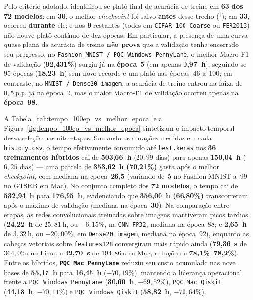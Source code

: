 \documentclass[
    12pt,
    openright,
    oneside,
    a4paper,
    english,
    brazil
]{abntex2}
\begin{document}
Pelo critério adotado, identificou-se platô final de acurácia de treino em \textbf{63 dos 72 modelos}: em \textbf{30}, o melhor \textit{checkpoint} foi salvo \textbf{antes} desse trecho (\(^\dagger\)); em \textbf{33}, ocorreu \textbf{durante} ele; e nos \textbf{9} restantes (todos em \texttt{CIFAR-100 Coarse} ou \texttt{FER2013}) não houve platô contínuo de dez épocas. Em particular, a presença de uma curva quase plana de acurácia de treino \textbf{não prova} que a validação tenha encerrado seu progresso: no \texttt{Fashion-MNIST / PQC Windows PennyLane}, o melhor Macro-F1 de validação (\textbf{92,431\%}) surgiu já na \textbf{época~5} (em apenas \textbf{0,97~h}), seguindo-se 95 épocas (\textbf{18,23~h}) sem novo recorde e um platô nas épocas~46 a~100; em contraste, no \texttt{MNIST / Dense20 imagem}, a acurácia de treino entrou na faixa de \(0{,}5~\text{p.p.}\) já na época~2, mas o maior Macro-F1 de validação ocorreu apenas na \textbf{época~98}.

A Tabela~\ref{tab:tempo_100ep_vs_melhor_epoca} e a Figura~\ref{fig:tempo_100ep_vs_melhor_epoca} sintetizam o impacto temporal dessa seleção nas oito etapas. Somando as durações medidas em cada \texttt{history.csv}, o tempo efetivamente consumido até \texttt{best.keras} nos \textbf{36 treinamentos híbridos} cai de \textbf{503,66~h} (\(20{,}99\) dias) para apenas \textbf{150,04~h} (\(6{,}25\) dias) --- uma parcela de \textbf{353,62~h (70,21\%)} gasta após o melhor \textit{checkpoint}, com mediana na época~\textbf{26,5} (variando de~5 no Fashion-MNIST a~99 no GTSRB em Mac). No conjunto completo dos \textbf{72 modelos}, o tempo cai de \textbf{532,94~h} para \textbf{176,95~h}, evidenciando que \textbf{356,00~h (66,80\%)} transcorreram após o máximo de validação (mediana na época~\textbf{30}). Na comparação entre etapas, as redes convolucionais treinadas sobre imagens mantiveram picos tardios (\textbf{24,22~h} de \(25{,}81~\text{h}\), ou \(-6{,}15\%\), na \texttt{CNN FP32}, mediana na época~88; e \textbf{2,65~h} de \(3{,}32~\text{h}\), ou \(-20{,}00\%\), em \texttt{Dense20 imagem}, mediana na época~92), enquanto as cabeças vetoriais sobre \texttt{features128} convergiram mais rápido ainda (\textbf{79,36~s} de \(364{,}02~\text{s}\) no Linux e \textbf{42,70~s} de \(194{,}86~\text{s}\) no Mac, redução de \textbf{78,1\%--78,2\%}). Entre os híbridos, \textbf{\texttt{PQC Mac PennyLane}} reduziu seu custo acumulado nas nove bases de \textbf{55,17~h} para \textbf{16,45~h} (\(-70{,}19\%\)), mantendo a liderança operacional frente a \texttt{PQC Windows PennyLane} (\textbf{30,60~h}, \(-69{,}52\%\)), \texttt{PQC Mac Qiskit} (\textbf{44,18~h}, \(-70{,}11\%\)) e \texttt{PQC Windows Qiskit} (\textbf{58,82~h}, \(-70{,}64\%\)).
\end{document}
